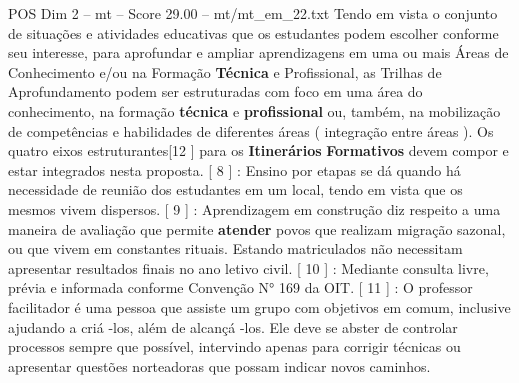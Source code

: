 \begin{textsample}{POS Dim 2 – mt – Score 29.00 – mt/mt\_em\_22.txt}
Tendo em vista o conjunto de situações e atividades educativas que os estudantes podem escolher conforme seu interesse, para aprofundar e ampliar aprendizagens em uma ou mais Áreas de Conhecimento e/ou na Formação \textbf{Técnica} e Profissional, as Trilhas de Aprofundamento podem ser estruturadas com foco em uma área do conhecimento, na formação \textbf{técnica} e \textbf{profissional} ou, também, na mobilização de competências e habilidades de diferentes áreas ( integração entre áreas ).
Os quatro eixos estruturantes[12 ] para os \textbf{Itinerários} \textbf{Formativos} devem compor e estar integrados nesta proposta. [ 8 ] : Ensino por etapas se dá quando há necessidade de reunião dos estudantes em um local, tendo em vista que os mesmos vivem dispersos. [ 9 ] : Aprendizagem em construção diz respeito a uma maneira de avaliação que permite \textbf{atender} povos que realizam migração sazonal, ou que vivem em constantes rituais.
Estando matriculados não necessitam apresentar resultados finais no ano letivo civil. [ 10 ] : Mediante consulta livre, prévia e informada conforme Convenção N{\EmojiFont °} 169 da OIT. [ 11 ] : O professor facilitador é uma pessoa que assiste um grupo com objetivos em comum, inclusive ajudando a criá -los, além de alcançá -los.
Ele deve se abster de controlar processos sempre que possível, intervindo apenas para corrigir técnicas ou apresentar questões norteadoras que possam indicar novos caminhos.

\end{textsample}
